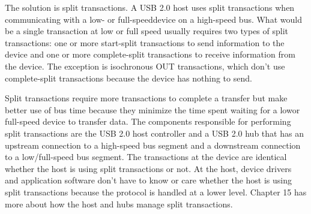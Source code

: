 The solution is split transactions. A USB 2.0 host uses split transactions when
communicating with a low- or full-speeddevice on a high-speed bus. What
would be a single transaction at low or full speed usually requires two types of
split transactions: one or more start-split transactions to send information to
the device and one or more complete-split transactions to receive information
from the device. The exception is isochronous OUT transactions, which don’t
use complete-split transactions because the device has nothing to send.

Split transactions require more transactions to complete a transfer but make
better use of bus time because they minimize the time spent waiting for a lowor full-speed device to transfer data. The components responsible for performing split transactions are the USB 2.0 host controller and a USB 2.0 hub that
has an upstream connection to a high-speed bus segment and a downstream
connection to a low/full-speed bus segment. The transactions at the device are
identical whether the host is using split transactions or not. At the host, device
drivers and application software don’t have to know or care whether the host is
using split transactions because the protocol is handled at a lower level. Chapter
15 has more about how the host and hubs manage split transactions.
